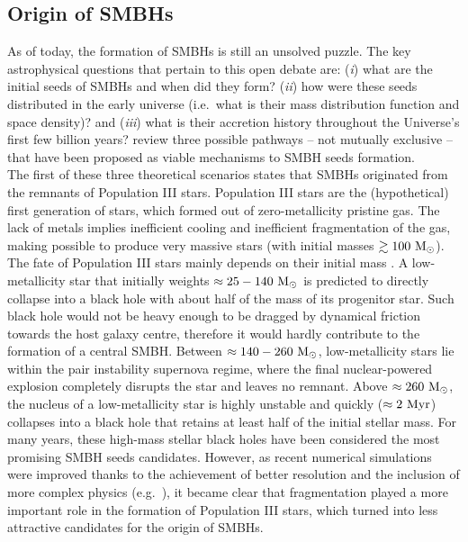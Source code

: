 \subsection{Origin of SMBHs}
As of today, the formation of SMBHs is still an unsolved puzzle. 
The key astrophysical questions that pertain to this open debate are: 
(\emph{i}) what are the initial seeds of SMBHs and when did they form? 
(\emph{ii}) how were these seeds distributed in the early universe 
(i.e.~what is their mass distribution function and space density)? 
and (\emph{iii}) what is their accretion history throughout the Universe's first few billion years? 
\cite{volonteribellovary2012} review three possible pathways -- not mutually exclusive -- 
that have been proposed as viable mechanisms to SMBH seeds formation. \\

The first of these three theoretical scenarios states that SMBHs originated from the remnants of Population III stars. 
Population III stars are the (hypothetical) first generation of stars, which formed out of zero-metallicity pristine gas. 
The lack of metals implies inefficient cooling and inefficient fragmentation of the gas, 
making possible to produce very massive stars (with initial masses $\gtrsim 100~\rm M_\odot$). 
The fate of Population III stars mainly depends on their initial mass \citep{heger2003}. 
A low-metallicity star that initially weights $\approx 25 - 140~\rm M_\odot$ is predicted to directly collapse into a black hole 
with about half of the mass of its progenitor star. 
Such black hole would not be heavy enough to be dragged by dynamical friction towards the host galaxy centre, 
therefore it would hardly contribute to the formation of a central SMBH. 
Between $\approx 140 - 260~\rm M_\odot$, low-metallicity stars lie within the pair instability supernova regime, 
where the final nuclear-powered explosion completely disrupts the star and leaves no remnant. 
Above $\approx 260~\rm M_\odot$, the nucleus of a low-metallicity star is highly unstable 
and quickly ($\approx 2~\rm Myr$) collapses into a black hole that retains at least half of the initial stellar mass. 
For many years, these high-mass stellar black holes have been considered the most promising SMBH seeds candidates. 
However, as recent numerical simulations were improved 
thanks to the achievement of better resolution and the inclusion of more complex physics 
(e.g.~\citealt{turk2009,greif2011,clark2011,stacy2012}), 
it became clear that fragmentation played a more important role in the formation of Population III stars, 
which turned into less attractive candidates for the origin of SMBHs. \\

